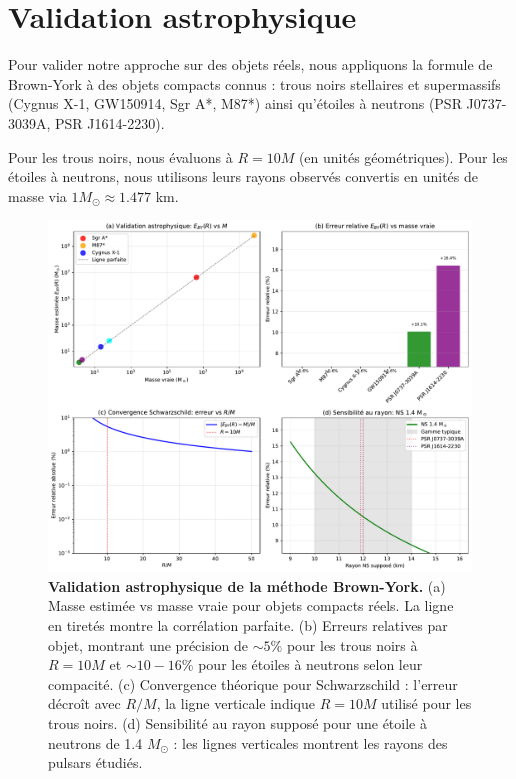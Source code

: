 \documentclass[11pt]{article}
\begin{document}
\section{Validation astrophysique}
\label{sec:validation}

Pour valider notre approche sur des objets réels, nous appliquons la formule de Brown-York à des objets compacts connus : trous noirs stellaires et supermassifs (Cygnus X-1, GW150914, Sgr A*, M87*) ainsi qu'étoiles à neutrons (PSR J0737-3039A, PSR J1614-2230).

Pour les trous noirs, nous évaluons à $R = 10M$ (en unités géométriques). Pour les étoiles à neutrons, nous utilisons leurs rayons observés convertis en unités de masse via $1 M_\odot \approx 1.477$ km.

\begin{figure}[!htb]
\centering
\includegraphics[width=\linewidth]{fig_astrophysical_validation.pdf}
\caption{\textbf{Validation astrophysique de la méthode Brown-York.} (a) Masse estimée vs masse vraie pour objets compacts réels. La ligne en tiretés montre la corrélation parfaite. (b) Erreurs relatives par objet, montrant une précision de $\sim 5\%$ pour les trous noirs à $R=10M$ et $\sim 10-16\%$ pour les étoiles à neutrons selon leur compacité. (c) Convergence théorique pour Schwarzschild : l'erreur décroît avec $R/M$, la ligne verticale indique $R=10M$ utilisé pour les trous noirs. (d) Sensibilité au rayon supposé pour une étoile à neutrons de 1.4 $M_\odot$ : les lignes verticales montrent les rayons des pulsars étudiés.}
\end{figure}
\end{document}
